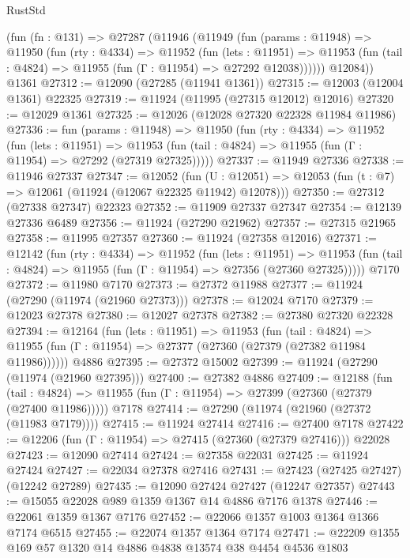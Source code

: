 \begin{lexlean}{RustStd}
\begin{coremodule}
{\begin{coremodule}
{{{{{{{{{{{{{{{{{{{{{{{{{{{{{{{{{{{{{{{{{{{{{{{{{{{{{{{{{{{{{{{{{{{{{{{{{{{{{{{{    (fun (fn : @131) =>
    @27287
      (@11946
        (@11949
          (fun (params : @11948) =>
          @11950
            (fun (rty : @4334) =>
            @11952
              (fun (lets : @11951) =>
              @11953 (fun (tail : @4824) => @11955 (fun (Γ : @11954) => @27292 @12038))))))
        @12084))
    @1361
@27312 := @12090 (@27285 (@11941 @1361))
@27315 := @12003 (@12004 @1361) @22325
@27319 := @11924 (@11995 (@27315 @12012) @12016)
@27320 := @12029 @1361
@27325 := @12026 (@12028 @27320 @22328 @11984 @11986)
@27336 := fun (params : @11948) =>
  @11950
    (fun (rty : @4334) =>
    @11952
      (fun (lets : @11951) =>
      @11953 (fun (tail : @4824) => @11955 (fun (Γ : @11954) => @27292 (@27319 @27325)))))
@27337 := @11949 @27336
@27338 := @11946 @27337
@27347 := @12052
    (fun (U : @12051) => @12053 (fun (t : @7) => @12061 (@11924 (@12067 @22325 @11942) @12078)))
@27350 := @27312 (@27338 @27347) @22323
@27352 := @11909 @27337 @27347
@27354 := @12139 @27336 @6489
@27356 := @11924 (@27290 @21962)
@27357 := @27315 @21965
@27358 := @11995 @27357
@27360 := @11924 (@27358 @12016)
@27371 := @12142
    (fun (rty : @4334) =>
    @11952
      (fun (lets : @11951) =>
      @11953 (fun (tail : @4824) => @11955 (fun (Γ : @11954) => @27356 (@27360 @27325)))))
    @7170
@27372 := @11980 @7170
@27373 := @27372 @11988
@27377 := @11924 (@27290 (@11974 (@21960 @27373)))
@27378 := @12024 @7170
@27379 := @12023 @27378
@27380 := @12027 @27378
@27382 := @27380 @27320 @22328
@27394 := @12164
    (fun (lets : @11951) =>
    @11953
      (fun (tail : @4824) =>
      @11955 (fun (Γ : @11954) => @27377 (@27360 (@27379 (@27382 @11984 @11986))))))
    @4886
@27395 := @27372 @15002
@27399 := @11924 (@27290 (@11974 (@21960 @27395)))
@27400 := @27382 @4886
@27409 := @12188
    (fun (tail : @4824) => @11955 (fun (Γ : @11954) => @27399 (@27360 (@27379 (@27400 @11986)))))
    @7178
@27414 := @27290 (@11974 (@21960 (@27372 (@11983 @7179))))
@27415 := @11924 @27414
@27416 := @27400 @7178
@27422 := @12206 (fun (Γ : @11954) => @27415 (@27360 (@27379 @27416))) @22028
@27423 := @12090 @27414
@27424 := @27358 @22031
@27425 := @11924 @27424
@27427 := @22034 @27378 @27416
@27431 := @27423 (@27425 @27427) (@12242 @27289)
@27435 := @12090 @27424 @27427 (@12247 @27357)
@27443 := @15055 @22028 @989 @1359 @1367 @14 @4886 @7176 @1378
@27446 := @22061 @1359 @1367 @7176
@27452 := @22066 @1357 @1003 @1364 @1366 @7174 @6515
@27455 := @22074 @1357 @1364 @7174
@27471 := @22209
    @1355
    @169
    @57
    @1320
    @14
    @4886
    @4838
    @13574
    @38
    @4454
    @4536
    @1803
}}}}}}}}}}}}}}}}}}}}}}}}}}}}}}}}}}}}}}}}}}}}}}}}}}}}}}}}}}}}}}}}}}}}}}}}}}}}}}}}
\end{coremodule}}
\end{coremodule}
\end{lexlean}
